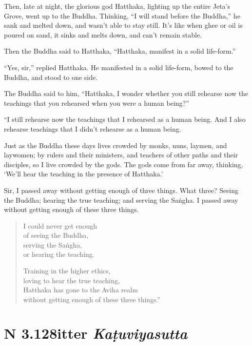 \documentclass[12pt,openany]{book}%
\newcommand*{\suttatitleacronym}[1]{\smaller[2]{#1}\vspace*{.3em}}
\newcommand*{\suttatitletranslation}[1]{\linebreak{#1}}
\newcommand*{\suttatitleroot}[1]{\linebreak\smaller[2]\itshape{#1}}
\newcommand*{\tocacronym}[1]{\hspace*{-3.3em}{#1}\quad}
\newcommand*{\toctranslation}[1]{#1}
\newcommand*{\tocroot}[1]{(\textit{#1})}
\begin{document}
Then, late at night, the glorious god Hatthaka, lighting up the entire Jeta’s Grove, went up to the Buddha. Thinking, “I will stand before the Buddha,” he sank and melted down, and wasn’t able to stay still. It’s like when ghee or oil is poured on sand, it sinks and melts down, and can’t remain stable. 

Then the Buddha said to Hatthaka, “Hatthaka, manifest in a solid life-form.” 

“Yes, sir,” replied Hatthaka. He manifested in a solid life-form, bowed to the Buddha, and stood to one side. 

The Buddha said to him, “Hatthaka, I wonder whether you still rehearse now the teachings that you rehearsed when you were a human being?” 

“I still rehearse now the teachings that I rehearsed as a human being. And I also rehearse teachings that I didn’t rehearse as a human being. 

Just as the Buddha these days lives crowded by monks, nuns, laymen, and laywomen; by rulers and their ministers, and teachers of other paths and their disciples, so I live crowded by the gods. The gods come from far away, thinking, ‘We’ll hear the teaching in the presence of Hatthaka.’ 

Sir, I passed away without getting enough of three things. What three? Seeing the Buddha; hearing the true teaching; and serving the \textsanskrit{Saṅgha}. I passed away without getting enough of these three things. 

\begin{verse}%
I could never get enough \\
of seeing the Buddha, \\
serving the \textsanskrit{Saṅgha}, \\
or hearing the teaching. 

Training in the higher ethics, \\
loving to hear the true teaching, \\
Hatthaka has gone to the Aviha realm \\
without getting enough of these three things.” 

%
\end{verse}

%
\section*{{\suttatitleacronym AN 3.128}{\suttatitletranslation Bitter }{\suttatitleroot Kaṭuviyasutta}}
\addcontentsline{toc}{section}{\tocacronym{AN 3.128} \toctranslation{Bitter } \tocroot{Kaṭuviyasutta}}
\end{document}
